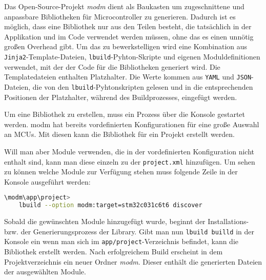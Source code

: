 
Das Open-Source-Projekt \emph{modm} \cite{github_modm}\cite{modm_io}   dient als Baukasten um zugeschnittene und anpassbare Bibliotheken für Microcontroller zu generieren.
Dadurch ist es möglich, dass eine Bibliothek nur aus den Teilen besteht, die tatsächlich in der Applikation und im Code verwendet werden müssen, ohne das es einen unnötig großen Overhead gibt.
Um das zu bewerkstelligen wird eine Kombination aus \texttt{Jinja2}-Template-Dateien, \texttt{lbuild}-Pyhton-Skripte und eigenen Moduldefinitionen verwendet, mit der der Code für die Bibliotheken generiert wird.
Die Templatedateien enthalten Platzhalter.
Die Werte kommen aus \texttt{YAML} und \texttt{JSON}-Dateien, die von den \texttt{lbuild}-Pyhtonskripten gelesen und in die entsprechenden Positionen der Platzhalter, während des Buildprozesses, eingefügt werden.
 
Um eine Bibliothek zu erstellen, muss ein Prozess über die Konsole gestartet werden.
modm hat bereits vordefinierten Konfigurationen für eine große Auswahl an MCUs.
Mit diesen kann die Bibliothek für ein Projekt erstellt werden.

Will man aber Module verwenden, die in der vordefinierten Konfiguration nicht enthalt sind, kann man diese einzeln zu der \texttt{project.xml} hinzufügen.
Um sehen zu können welche Module zur Verfügung stehen muss folgende Zeile in der Konsole ausgeführt werden:

\vspace{3mm}
\begin{lstlisting}[language=bash, caption={Konsolenbefehl um verf\"ugbare Module aufgelistet zu bekommen; hier f\"ur den STM32C031C6T6 Microcontroller.}, label={lst:modm_lbild_discover}]
\modm\app\project>
	lbuild --option modm:target=stm32c031c6t6 discover
\end{lstlisting}

Sobald die gewünschten Module hinzugefügt wurde, beginnt der Installations- bzw. der Generierungsprozess der Library. 
Gibt man nun \texttt{lbuild builld} in der Konsole ein wenn man sich im \texttt{app/project}-Verzeichnis befindet, kann die Bibliothek erstellt werden.
Nach erfolgreichem Build erscheint in dem Projektverzeichnis ein neuer Ordner \emph{modm}.
Dieser enthält die generierten Dateien der ausgewählten Module.

%

